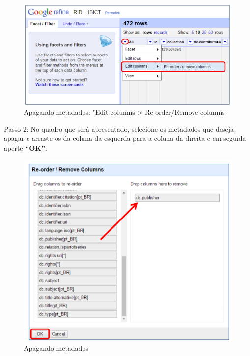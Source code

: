 \documentclass[12pt,hidelinks]{article}
\begin{document}
\newpage

    \begin{figure}[!htp]
                \centering
                \includegraphics[scale=0.8]{figura/Figura201.png}
                \caption{ Apagando metadados: "Edit columns > Re-order/Remove columns}
            \label{Rotulo}
        \end{figure}
    
    Passo 2: No quadro que será apresentado, selecione os metadados que deseja apagar e arraste-os da coluna da esquerda para a coluna da direita e em seguida aperte \textbf{“OK”}.
    
     \begin{figure}[!htp]
                \centering
                \includegraphics[scale=0.8]{figura/Figura202.png}
                \caption{Apagando metadados}
            \label{Rotulo}
        \end{figure}
\end{document}
